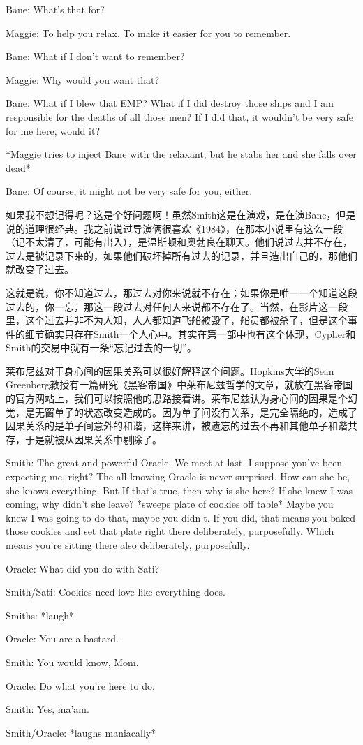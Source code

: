 \documentclass[UTF8]{ctexart}
\newenvironment{myquote}{\color{green} \setlength{\leftskip}{6em} \setlength{\rightskip}{4em} \setlength{\parindent}{-2em}}{\par}
\begin{document}
\begin{myquote}
Bane: What's that for?

Maggie: To help you relax. To make it easier for you to remember.

Bane: What if I don't want to remember?

Maggie: Why would you want that?

Bane: What if I blew that EMP? What if I did destroy those ships and I am responsible for the deaths of all those men? If I did that, it wouldn't be very safe for me here, would it?

*Maggie tries to inject Bane with the relaxant, but he stabs her and she falls over dead*

Bane: Of course, it might not be very safe for you, either.
\end{myquote}

如果我不想记得呢？这是个好问题啊！虽然Smith这是在演戏，是在演Bane，但是说的道理很经典。我之前说过导演俩很喜欢《1984》，在那本小说里有这么一段（记不太清了，可能有出入），是温斯顿和奥勃良在聊天。他们说过去并不存在，过去是被记录下来的，如果他们破坏掉所有过去的记录，并且造出自己的，那他们就改变了过去。

这就是说，你不知道过去，那过去对你来说就不存在；如果你是唯一一个知道这段过去的，你一忘，那这一段过去对任何人来说都不存在了。当然，在影片这一段里，这个过去并非不为人知，人人都知道飞船被毁了，船员都被杀了，但是这个事件的细节确实只存在Smith一个人心中。其实在第一部中也有这个体现，Cypher和Smith的交易中就有一条“忘记过去的一切”。

莱布尼兹对于身心间的因果关系可以很好解释这个问题。Hopkins大学的Sean Greenberg教授有一篇研究《黑客帝国》中莱布尼兹哲学的文章，就放在黑客帝国的官方网站上，我们可以按照他的思路接着讲。莱布尼兹认为身心间的因果是个幻觉，是无窗单子的状态改变造成的。因为单子间没有关系，是完全隔绝的，造成了因果关系的是单子间意外的和谐，这样来讲，被遗忘的过去不再和其他单子和谐共存，于是就被从因果关系中剔除了。

\begin{myquote}
Smith: The great and powerful Oracle. We meet at last. I suppose you've been expecting me, right? The all-knowing Oracle is never surprised. How can she be, she knows everything. But If that's true, then why is she here? If she knew I was coming, why didn't she leave? *sweeps plate of cookies off table* Maybe you knew I was going to do that, maybe you didn't. If you did, that means you baked those cookies and set that plate right there deliberately, purposefully. Which means you're sitting there also deliberately, purposefully.

Oracle: What did you do with Sati?

Smith/Sati: Cookies need love like everything does.

Smiths: *laugh*

Oracle: You are a bastard.

Smith: You would know, Mom.

Oracle: Do what you're here to do.

Smith: Yes, ma'am.

Smith/Oracle: *laughs maniacally*
\end{myquote}
\end{document}
